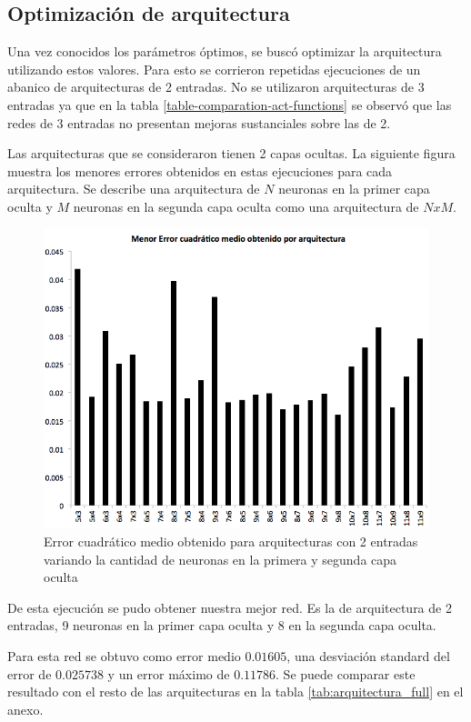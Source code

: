 \documentclass[a4paper,10pt]{article}
\begin{document}
    \subsection{Optimización de arquitectura}
    \label{sec:arquitectura-optima}

    Una vez conocidos los parámetros óptimos, se buscó optimizar la arquitectura utilizando estos valores.
    Para esto se corrieron repetidas ejecuciones de un abanico de arquitecturas de 2 entradas.
    No se utilizaron arquitecturas de 3 entradas ya que en la tabla \ref{table-comparation-act-functions} se observó que las redes de 3 entradas no presentan mejoras sustanciales sobre las de 2.

    Las arquitecturas que se consideraron tienen 2 capas ocultas.
    La siguiente figura muestra los menores errores obtenidos en estas
    ejecuciones para cada arquitectura. Se describe una arquitectura de $N$
    neuronas en la primer capa oculta y $M$ neuronas en la segunda capa oculta
    como una arquitectura de $NxM$.

    \begin{figure}[H]
        \includegraphics[scale=0.5]{./images/arquitecturas.png}
        \caption{Error cuadrático medio obtenido para arquitecturas con 2 entradas variando la cantidad de neuronas en la primera y segunda capa oculta}
        \label{fig:arquitecturas}
    \end{figure}

    De esta ejecución se pudo obtener nuestra mejor red.
    Es la de arquitectura de 2 entradas, 9 neuronas en la primer capa oculta y 8 en la segunda capa oculta.

    Para esta red se obtuvo como error medio $0.01605$, una desviación standard del error de $0.025738$ y un error máximo de $0.11786$.
    Se puede comparar este resultado con el resto de las arquitecturas en la tabla \ref{tab:arquitectura_full} en el anexo.


\end{document}
